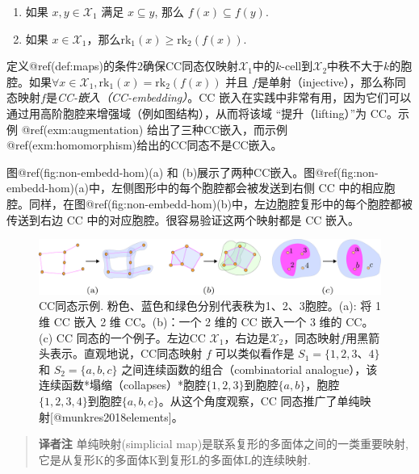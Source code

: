 \documentclass[
  12pt,
]{krantz}
\providecommand{\tightlist}{%
  \setlength{\itemsep}{0pt}\setlength{\parskip}{0pt}}
\begin{document}
\begin{enumerate}
\def\labelenumi{\arabic{enumi}.}
\tightlist
\item
  如果 \(x,y\in\mathcal{X}_1\) 满足 \(x\subseteq y\), 那么
  \(f(x) \subseteq f(y)\).
\item
  如果
  \(x\in\mathcal{X}_1\)，那么\(\mbox{rk}_1(x)\geq \mbox{rk}_2(f(x))\).
\end{enumerate}

定义@ref(def:maps)的条件2确保CC同态仅映射\(\mathcal{X}_1\)中的\(k\)-cell到\(\mathcal{X}_2\)中秩不大于\(k\)的胞腔。如果\(\forall x \in \mathcal{X}_1, \mbox{rk}_1(x) = \mbox{rk}_2(f(x))\)
并且
\(f\)是单射（injective），那么称同态映射\(f\)是\emph{CC-嵌入（CC-embedding）}。CC
嵌入在实践中非常有用，因为它们可以通过用高阶胞腔来增强域（例如图结构），从而将该域
``提升（lifting）''为 CC。示例 @ref(exm:augmentation)
给出了三种CC嵌入，而示例@ref(exm:homomorphism)给出的CC同态不是CC嵌入。

\label{augmentation}
图@ref(fig:non-embedd-hom)(a) 和
(b)展示了两种CC嵌入。图@ref(fig:non-embedd-hom)(a)中，左侧图形中的每个胞腔都会被发送到右侧
CC
中的相应胞腔。同样，在图@ref(fig:non-embedd-hom)(b)中，左边胞腔复形中的每个胞腔都被传送到右边
CC 中的对应胞腔。很容易验证这两个映射都是 CC 嵌入。

\begin{figure}

{\centering \includegraphics{figures/cc_map} 

}

\caption{CC同态示例. 粉色、蓝色和绿色分别代表秩为1、2、3胞腔。(a): 将 1 维 CC 嵌入 2 维 CC。(b)：一个 2 维的 CC 嵌入一个 3 维的 CC。(c) CC 同态的一个例子。左边CC $\mathcal{X}_1$，右边是$\mathcal{X}_2$，同态映射$f$用黑箭头表示。直观地说，CC同态映射 $f$ 可以类似看作是 $S_1 =\{1, 2, 3、 4\}$ 和 $S_2 =\{a, b, c\}$ 之间连续函数的组合（combinatorial analogue），该连续函数*塌缩（collapses）*胞腔$\{1,2,3\}$到胞腔$\{a,b\}$，胞腔$\{1,2,3,4\}$到胞腔$\{a,b,c\}$。从这个角度观察，CC 同态推广了单纯映射[@munkres2018elements]。}\label{fig:non-embedd-hom}
\end{figure}

\begin{glossarybox}

\begin{quote}
\textbf{译者注} 单纯映射(simplicial
map)是联系复形的多面体之间的一类重要映射,它是从复形K的多面体\textbar K\textbar 到复形L的多面体\textbar L\textbar 的连续映射.
\end{quote}

\end{glossarybox}
\end{document}
